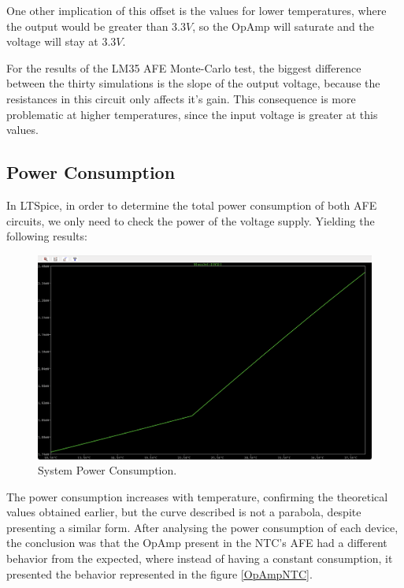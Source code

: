 \documentclass[12pt]{article}
\begin{document}
    One other implication of this offset is the values for lower temperatures, where the output would be greater than $3.3V$, so the OpAmp will saturate and the voltage will stay at $3.3V$.

    For the results of the LM35 AFE Monte-Carlo test, the biggest difference between the thirty simulations is the slope of the output voltage,
    because the resistances in this circuit only affects it's gain. This consequence is more problematic at higher temperatures, since the input voltage is greater at this values.

    \subsection{Power Consumption}
    
    In LTSpice, in order to determine the total power consumption of both AFE circuits, we only need to check the power of the voltage supply.
    Yielding the following results: 
        
    \begin{figure}[H] 
        \centering
        \includegraphics*[scale = 0.3]{images/PowerConsumption.png}
        \caption{System Power Consumption.}
        \label{wrap-fig:1}
    \end{figure}

    The power consumption increases with temperature, confirming the theoretical values obtained earlier, but the curve described is not a parabola, despite presenting a similar form. After analysing the power consumption of each device, the conclusion was that the OpAmp present in the NTC's AFE had a different behavior from the expected, where instead of having a constant consumption, it presented the behavior represented in the figure \ref{OpAmpNTC}.
 
\end{document}
